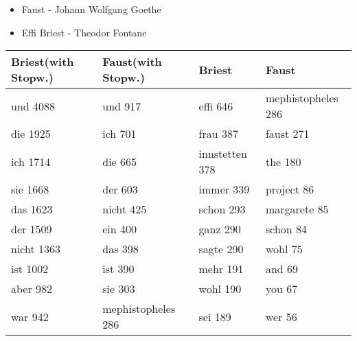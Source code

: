 \begin{frame}[c]
	\begin{itemize}
		\begin{itemize}
			\item Faust - Johann Wolfgang Goethe
			\item Effi Briest - Theodor Fontane
		\end{itemize}
	\end{itemize}

	\begin{small}
	\begin{tabular}{|l|l|l|l|}
		\hline \textbf{Briest(with Stopw.)} & \textbf{Faust(with Stopw.)} & \textbf{Briest} & \textbf{Faust} \\ 
		\hline und 4088 & und 917 & effi 646 & mephistopheles	286  \\ 
		\hline die 1925 & ich 701 & frau 387 & faust 271 \\ 
		\hline ich 1714 & die 665 & innstetten 378 & the 180 \\ 
		\hline sie 1668 & der 603 & immer 339 & project 86 \\ 
		\hline das 1623 & nicht 425 & schon 293 & margarete	85 \\ 
		\hline der 1509 & ein 400 	& ganz 290 & schon 84 \\ 
		\hline nicht 1363 & das 398	& sagte 290 & wohl 75 \\ 
		\hline ist 1002 & ist 390 & mehr 191 & and 69 \\ 
		\hline aber 982 & sie 303 & wohl 190 & you 67 \\ 
		\hline war 942 	& mephistopheles 286 & sei 189 & wer 56 \\
		\hline 
	\end{tabular} 
	\end{small}
\end{frame}

